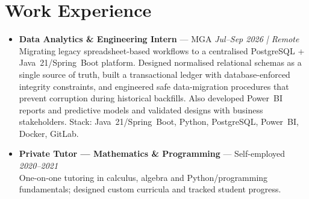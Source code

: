 \documentclass[10pt,a4paper]{article}
\begin{document}
\section{Work Experience}
{\small
\begin{itemize}

  \item \textbf{Data Analytics \& Engineering Intern} --- MGA \hfill \textit{Jul--Sep 2026 | Remote}\\
  Migrating legacy spreadsheet-based workflows to a centralised PostgreSQL + Java~21/Spring~Boot platform.
  Designed normalised relational schemas as a single source of truth, built a transactional ledger with
  database-enforced integrity constraints, and engineered safe data-migration procedures that prevent
  corruption during historical backfills. Also developed Power~BI reports and predictive models and validated
  designs with business stakeholders. Stack: Java~21/Spring~Boot, Python, PostgreSQL, Power~BI, Docker, GitLab.

  \item \textbf{Private Tutor --- Mathematics \& Programming} --- Self-employed \hfill \textit{2020--2021}\\
  One-on-one tutoring in calculus, algebra and Python/programming fundamentals;
  designed custom curricula and tracked student progress.

\end{itemize}
}

\end{document}
